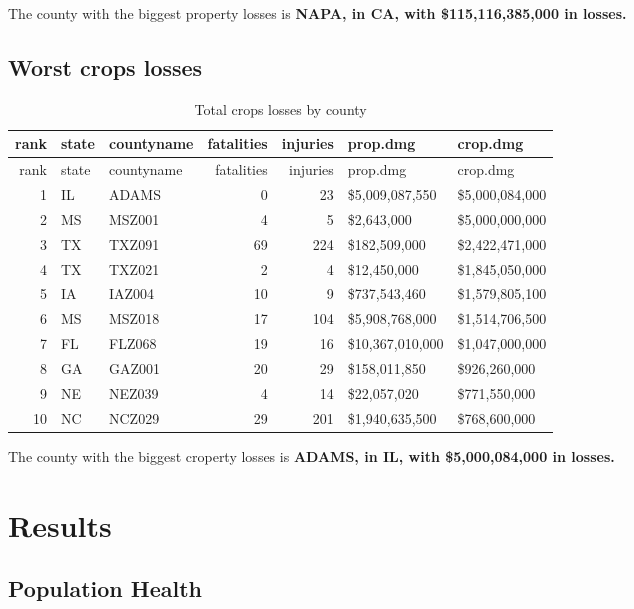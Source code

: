 \documentclass[]{article}
\begin{document}
The county with the biggest property losses is \textbf{NAPA, in CA, with
\$115,116,385,000 in losses.}

\subsection{Worst crops losses}\label{worst-crops-losses}

\begin{longtable}[]{@{}rllrrll@{}}
\caption{Total crops losses by county}\tabularnewline
\toprule
rank & state & countyname & fatalities & injuries & prop.dmg &
crop.dmg\tabularnewline
\midrule
\endfirsthead
\toprule
rank & state & countyname & fatalities & injuries & prop.dmg &
crop.dmg\tabularnewline
\midrule
\endhead
1 & IL & ADAMS & 0 & 23 & \$5,009,087,550 &
\$5,000,084,000\tabularnewline
2 & MS & MSZ001 & 4 & 5 & \$2,643,000 & \$5,000,000,000\tabularnewline
3 & TX & TXZ091 & 69 & 224 & \$182,509,000 &
\$2,422,471,000\tabularnewline
4 & TX & TXZ021 & 2 & 4 & \$12,450,000 & \$1,845,050,000\tabularnewline
5 & IA & IAZ004 & 10 & 9 & \$737,543,460 &
\$1,579,805,100\tabularnewline
6 & MS & MSZ018 & 17 & 104 & \$5,908,768,000 &
\$1,514,706,500\tabularnewline
7 & FL & FLZ068 & 19 & 16 & \$10,367,010,000 &
\$1,047,000,000\tabularnewline
8 & GA & GAZ001 & 20 & 29 & \$158,011,850 & \$926,260,000\tabularnewline
9 & NE & NEZ039 & 4 & 14 & \$22,057,020 & \$771,550,000\tabularnewline
10 & NC & NCZ029 & 29 & 201 & \$1,940,635,500 &
\$768,600,000\tabularnewline
\bottomrule
\end{longtable}

The county with the biggest croperty losses is \textbf{ADAMS, in IL,
with \$5,000,084,000 in losses.}

\section{Results}\label{results}

\subsection{Population Health}\label{population-health}
\end{document}
